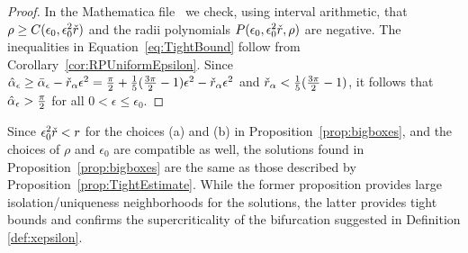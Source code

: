 \begin{proof}
	In the Mathematica file~\cite{mathematicafile}  we check, using interval arithmetic, that  $\rho \geq C(\epsilon_0, \epsilon_0^2 \check{r})$ and  the radii polynomials $P(\epsilon_0,\epsilon_0^2 \check{r},\rho)$ are negative.  
 The inequalities in Equation~\eqref{eq:TightBound} follow from Corollary~\ref{cor:RPUniformEpsilon}. 
 Since $\hat{\alpha}_\epsilon \geq \bar{\alpha}_\epsilon - \check{r}_\alpha \epsilon^2
 = \tfrac{\pi}{2} +\frac{1}{5}(\frac{3\pi}{2}-1)\epsilon^2 - \check{r}_\alpha \epsilon^2$ and $ \check{r}_\alpha < \tfrac{1}{5} ( \tfrac{3 \pi}{2} -1) $, it follows that $ \hat{\alpha}_\epsilon > \tfrac{\pi}{2} $ for all $ 0 < \epsilon \leq \epsilon_0$. 
\end{proof}

\begin{remark}\label{r:nested}
Since $\epsilon_0^2\check{r} < r$ for the choices (a) and (b) in Proposition~\ref{prop:bigboxes},
and the choices of $\rho$ and $\epsilon_0$ are compatible as well, the solutions found in Proposition~\ref{prop:bigboxes} are the same as those described by Proposition~\ref{prop:TightEstimate}. While the former proposition provides large isolation/uniqueness neighborhoods for the solutions,
the latter provides tight bounds and confirms the  supercriticality of the bifurcation suggested in Definition \ref{def:xepsilon}.

	
	
	

\end{remark}


